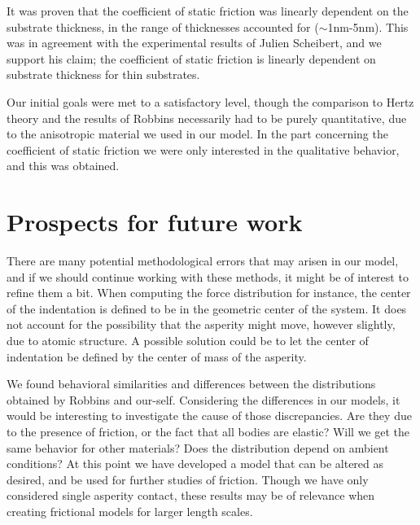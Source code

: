 \documentclass[twoside,english]{uiofysmaster}
\begin{document}
It was proven that the coefficient of static friction was linearly dependent on the substrate thickness, in the range of thicknesses accounted for ($\sim$1nm-5nm). 
This was in agreement with the experimental results of Julien Scheibert, and we support his claim; the coefficient of static friction is linearly dependent on substrate thickness for thin substrates.

Our initial goals were met to a satisfactory level, though the comparison to Hertz theory and the results of Robbins necessarily had to be purely quantitative, due to the anisotropic material we used in our model.    
In the part concerning the coefficient of static friction we were only interested in the qualitative behavior, and this was obtained.




\section{Prospects for future work}
There are many potential methodological errors that may arisen in our model, and if we should continue working with these methods, it might be of interest to refine them a bit.
When computing the force distribution for instance, the center of the indentation is defined to be in the geometric center of the system. 
It does not account for the possibility that the asperity might move, however slightly, due to atomic structure. 
A possible solution could be to let the center of indentation be defined by the center of mass of the asperity. 



We found behavioral similarities and differences between the distributions obtained by Robbins and our-self. 
Considering the differences in our models, it would be interesting to investigate the cause of those discrepancies. 
Are they due to the presence of friction, or the fact that all bodies are elastic? 
Will we get the same behavior for other materials?
Does the distribution depend on ambient conditions?
At this point we have developed a model that can be altered as desired, and be used for further studies of friction.
Though we have only considered single asperity contact, these results may be of relevance when creating frictional models for larger length scales.

  





 


\end{document}
